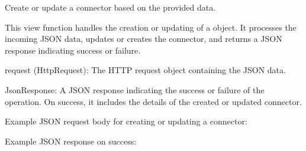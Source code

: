 \documentclass[letterpaper,10pt,english]{sphinxmanual}
\begin{document}
\begin{fulllineitems}
\label{\detokenize{app:app.views.update_connector}}
\pysigstartsignatures
{}
\pysigstopsignatures
\sphinxAtStartPar
Create or update a connector based on the provided data.

\sphinxAtStartPar
This view function handles the creation or updating of a  object. It processes 
the incoming JSON data, updates or creates the connector, and returns a JSON response 
indicating success or failure.
\begin{description}
\sphinxAtStartPar
request (HttpRequest): The HTTP request object containing the JSON data.

\sphinxAtStartPar
JsonResponse: A JSON response indicating the success or failure of the operation. 
On success, it includes the details of the created or updated connector.

\sphinxAtStartPar
Example JSON request body for creating or updating a connector:

\begin{sphinxVerbatim}[commandchars=\\\{\}]
\end{sphinxVerbatim}

\sphinxAtStartPar
Example JSON response on success:

\begin{sphinxVerbatim}[commandchars=\\\{\}]
\end{sphinxVerbatim}


\end{description}
\end{fulllineitems}
\end{document}
